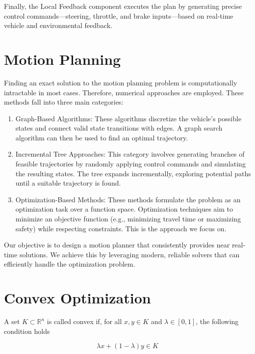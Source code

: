 Finally, the Local Feedback component executes the plan by generating precise control commands—steering, throttle, and brake inputs—based on
real-time vehicle and environmental feedback.

\section{Motion Planning}

Finding an exact solution to the motion planning problem is computationally intractable in most cases.
Therefore, numerical approaches are employed.
These methods fall into three main categories:

\begin{enumerate}
	\item Graph-Based Algorithms: These algorithms discretize the vehicle's possible states
	      and connect valid state transitions with edges.
	      A graph search algorithm can then be used to find an optimal trajectory.

	\item Incremental Tree Approaches: This category involves generating branches of feasible trajectories by randomly applying control commands and simulating
	      the resulting states.
	      The tree expands incrementally, exploring potential paths until a suitable trajectory is found.

	\item Optimization-Based Methods: These methods formulate the problem as an optimization task over a function space.
	      Optimization techniques aim to minimize an objective function (e.g., minimizing travel time or maximizing safety) while respecting constraints.
	      This is the approach we focus on.
\end{enumerate}

Our objective is to design a motion planner that consistently provides near real-time solutions.
We achieve this by leveraging modern, reliable solvers that can efficiently handle the optimization problem.

\section{Convex Optimization}

A set $K\subset \mathbb{R}^n$ is called convex if, for all $x, y\in K$ and $\lambda\in [0, 1]$, the following condition holds

\begin{equation}
	\lambda x + (1-\lambda) y \in K
	\label{eq:convex_set_criteria}
\end{equation}

